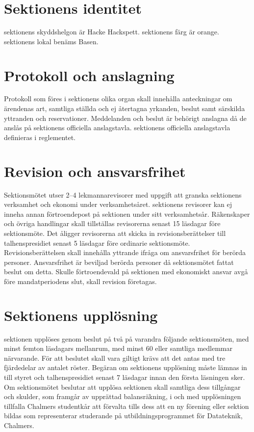 \documentclass[a4paper]{dteklag}
\begin{document}
\section{Sektionens identitet}
\para[Skyddshelgon] sektionens skyddshelgon är Hacke Hackspett.
\para[Sektionsfärg] sektionens färg är orange.
\para[Sektionslokal] sektionens lokal benäms Basen.

\section{Protokoll och anslagning}
\para[Allmänt] Protokoll som föres i sektionens olika organ skall innehålla anteckningar om ärendenas art, samtliga ställda och ej återtagna yrkanden, beslut samt särskilda yttranden och reservationer.
\para[Anslagning] Meddelanden och beslut är behörigt anslagna då de anslås på sektionens officiella anslagstavla. sektionens officiella anslagstavla definieras i reglementet.

\section{Revision och ansvarsfrihet}
\para[Revisorer] Sektionsmötet utser 2–4 lekmannarevisorer med uppgift att granska sektionens verksamhet och ekonomi under verksamhetsåret.
\stycke sektionens revisorer kan ej inneha annan förtroendepost på sektionen under sitt verksamhetsår.
\stycke Räkenskaper och övriga handlingar skall tillställas revisorerna senast 15 läsdagar före sektionsmöte.
\para[Åligganden] Det åligger revisorerna att skicka in revisionsberättelser till talhenspresidiet senast 5 läsdagar före ordinarie sektionsmöte.
\stycke Revisionsberättelsen skall innehålla yttrande ifråga om ansvarsfrihet för berörda personer.
\para[Ansvarsfrihet] Ansvarsfrihet är beviljad berörda personer då sektionsmötet fattat beslut om detta.
\stycke Skulle förtroendevald på sektionen med ekonomiskt ansvar avgå före mandatperiodens slut, skall revision företagas.

\section{Sektionens upplösning}
 sektionen upplöses genom beslut på två på varandra följande sektionsmöten, med minst femton läsdagars mellanrum, med minst 60 eller samtliga medlemmar närvarande. För att beslutet skall vara giltigt krävs att det antas med tre fjärdedelar av antalet röster. Begäran om sektionens upplösning måste lämnas in till styret och talhenspresidiet senast 7 läsdagar innan den första läsningen sker.
 Om sektionsmötet beslutar att upplösa sektionen skall samtliga dess tillgångar och skulder, som framgår av upprättad balansräkning, i och med upplösningen tillfalla Chalmers studentkår att förvalta tills dess att en ny förening eller sektion bildas som representerar studerande på utbildningsprogrammet för Datateknik, Chalmers.
\end{document}
